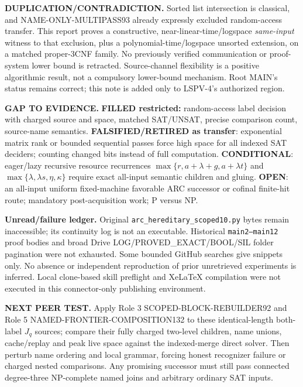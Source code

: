 \documentclass[11pt]{article}
\begin{document}
\textbf{DUPLICATION/CONTRADICTION.} Sorted list intersection is classical, and NAME-ONLY-MULTIPASS93 already expressly excluded random-access transfer. This report proves a constructive, near-linear-time/logspace \emph{same-input} witness to that exclusion, plus a polynomial-time/logspace unsorted extension, on a matched proper-3CNF family. No previously verified communication or proof-system lower bound is retracted. Source-channel flexibility is a positive algorithmic result, not a compulsory lower-bound mechanism. Root MAIN's status remains correct; this note is added only to LSPV-4's authorized region.

\textbf{GAP TO EVIDENCE.} \textbf{FILLED restricted:} random-access label decision with charged source and space, matched SAT/UNSAT, precise comparison count, source-name semantics. \textbf{FALSIFIED/RETIRED as transfer}: exponential matrix rank or bounded sequential passes force high space for all indexed SAT deciders; counting changed bits instead of full computation. \textbf{CONDITIONAL}: eager/lazy recursive resource recurrences \(\max\{r,a+\lambda+g,a+\lambda t\}\) and \(\max\{\lambda,\lambda s,\eta,\kappa\}\) require exact all-input semantic children and gluing. \textbf{OPEN}: an all-input uniform fixed-machine favorable ARC successor or cofinal finite-hit route; mandatory post-acquisition work; P versus NP.

\textbf{Unread/failure ledger.} Original \texttt{arc\_hereditary\_scoped10.py} bytes remain inaccessible; its continuity log is not an executable. Historical \texttt{main2--main12} proof bodies and broad Drive LOG/PROVED\_EXACT/BOOL/SIL folder pagination were not exhausted. Some bounded GitHub searches give snippets only. No absence or independent reproduction of prior unretrieved experiments is inferred. Local clone-based skill preflight and XeLaTeX compilation were not executed in this connector-only publishing environment.

\textbf{NEXT PEER TEST.} Apply Role 3 SCOPED-BLOCK-REBUILDER92 and Role 5 NAMED-FRONTIER-COMPOSITION132 to these identical-length both-label \(J_q\) sources; compare their fully charged two-level children, name unions, cache/replay and peak live space against the indexed-merge direct solver. Then perturb name ordering and local grammar, forcing honest recognizer failure or charged nested comparisons. Any promising successor must still pass connected degree-three NP-complete named joins and arbitrary ordinary SAT inputs.
\end{document}
